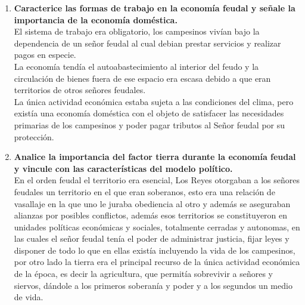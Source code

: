 \documentclass[12pt]{book}
\begin{document}
\begin{enumerate}
\item \textbf{ Caracterice las formas de trabajo en la economía feudal y señale la importancia de la
economía doméstica.}
\\
El sistema de trabajo era obligatorio, los campesinos vivían bajo la dependencia de un señor feudal al cual debian prestar servicios y realizar pagos en especie.
\\ 
La economía tendía el autoabastecimiento al interior del feudo y la circulación de bienes fuera de ese espacio era escasa debido a que eran territorios de otros señores feudales. \\
La única actividad económica estaba sujeta a las condiciones del clima, pero existía una economía doméstica con el objeto de satisfacer las necesidades primarias de los campesinos y poder pagar tributos al Señor feudal por su protección. 

\item \textbf{Analice la importancia del factor tierra durante la economía feudal y vincule con las
características del modelo político.}\\
En el orden feudal el territorio era esencial, Los Reyes otorgaban a los señores feudales un territorio en el que eran soberanos, esto era una relación de vasallaje en la que uno le juraba obediencia al otro y además se aseguraban alianzas por posibles conflictos, además esos territorios se constituyeron en unidades políticas económicas y sociales, totalmente cerradas y autonomas, en las cuales el señor feudal tenía el poder de administrar justicia, fijar leyes y disponer de todo lo que en ellas existía incluyendo la vida de los campesinos,  por otro lado la tierra era el principal recurso de la única actividad económica de la época, es decir la agricultura,  que permitía sobrevivir a señores y siervos, dándole a los primeros soberanía y poder y a los segundos un medio de vida. 


\end{enumerate}
\end{document}
